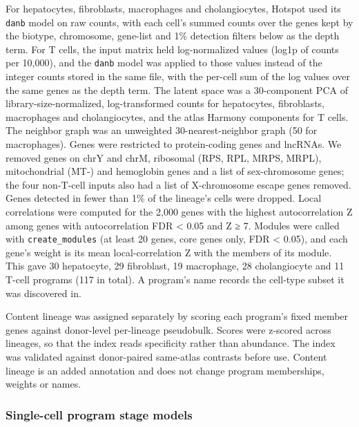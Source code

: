 For hepatocytes, fibroblasts, macrophages and cholangiocytes, Hotspot used its \texttt{danb} model on raw counts, with each cell's summed counts over the genes kept by the biotype, chromosome, gene-list and 1\% detection filters below as the depth term. For T cells, the input matrix held log-normalized values (log1p of counts per 10,000), and the \texttt{danb} model was applied to those values instead of the integer counts stored in the same file, with the per-cell sum of the log values over the same genes as the depth term. The latent space was a 30-component PCA of library-size-normalized, log-transformed counts for hepatocytes, fibroblasts, macrophages and cholangiocytes, and the atlas Harmony components for T cells. The neighbor graph was an unweighted 30-nearest-neighbor graph (50 for macrophages). Genes were restricted to protein-coding genes and lncRNAs. We removed genes on chrY and chrM, ribosomal (RPS, RPL, MRPS, MRPL), mitochondrial (MT-) and hemoglobin genes and a list of sex-chromosome genes; the four non-T-cell inputs also had a list of X-chromosome escape genes removed. Genes detected in fewer than 1\% of the lineage's cells were dropped. Local correlations were computed for the 2,000 genes with the highest autocorrelation Z among genes with autocorrelation FDR \textless{} 0.05 and Z ≥ 7. Modules were called with \texttt{create\_\allowbreak{}modules} (at least 20 genes, core genes only, FDR \textless{} 0.05), and each gene's weight is its mean local-correlation Z with the members of its module. This gave 30 hepatocyte, 29 fibroblast, 19 macrophage, 28 cholangiocyte and 11 T-cell programs (117 in total). A program's name records the cell-type subset it was discovered in.

Content lineage was assigned separately by scoring each program's fixed member genes against donor-level per-lineage pseudobulk. Scores were z-scored across lineages, so that the index reads specificity rather than abundance. The index was validated against donor-paired same-atlas contrasts before use. Content lineage is an added annotation and does not change program memberships, weights or names.

\subsubsection{Single-cell program stage models}\label{single-cell-program-stage-models}

